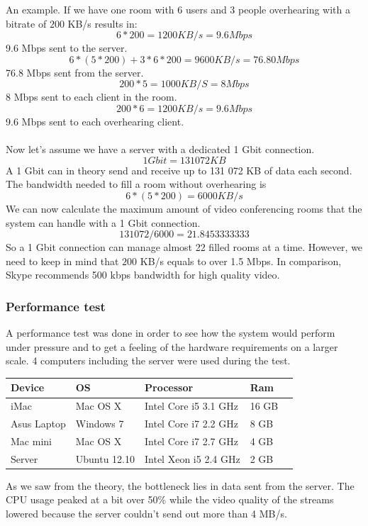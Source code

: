 \documentclass[12pt, titlepage]{article}
\begin{document}
An example. If we have one room with 6 users and 3 people overhearing with a bitrate of $200$ KB/s results in:
\begin{equation}
6*200 = 1200 KB/s = 9.6 Mbps
\end{equation}
9.6 Mbps sent to the server.
\begin{equation}
6*(5*200) + 3*6*200 = 9 600 KB/s = 76.80 Mbps
\end{equation}
76.8 Mbps sent from the server.
\begin{equation}
200*5 = 1000 KB/S  = 8 Mbps
\end{equation}
8 Mbps sent to each client in the room.
\begin{equation}
200*6 = 1200 KB/s = 9.6 Mbps
\end{equation}
9.6 Mbps sent to each overhearing client.
\\\\
Now let's assume we have a server with a dedicated 1 Gbit connection. 
\begin{equation}
1 Gbit = 131 072 KB
\end{equation}
A 1 Gbit can in theory send and receive up to 131 072 KB of data each second. The bandwidth needed to fill a room without overhearing is 
\begin{equation}
6*(5*200) = 6 000 KB/s
\end{equation}
We can now calculate the maximum amount of video conferencing rooms that the system can handle with a 1 Gbit connection.
\begin{equation}
131 072/6 000 = 21.8453333333
\end{equation}
So a 1 Gbit connection can manage almost 22 filled rooms at a time. However, we need to keep in mind that $200$ KB/s equals to over 1.5 Mbps. In comparison, Skype recommends 500 kbps bandwidth for high quality video\cite{39}.
\subsubsection{Performance test}

A performance test was done in order to see how the system would perform under pressure and to get a feeling of the hardware requirements on a larger scale. 4 computers including the server were used during the test.
\begin{center}
    \begin{tabular}{| l | l | l | l | l |}
    \hline
    Device & OS & Processor & Ram \\ \hline
    iMac & Mac OS X & Intel Core i5 3.1 GHz & 16 GB\\ \hline
    Asus Laptop & Windows 7 & Intel Core i7 2.2 GHz & 8 GB \\ \hline
    Mac mini & Mac OS X & Intel Core i7 2.7 GHz & 4 GB \\ \hline
    Server & Ubuntu 12.10 & Intel Xeon i5 2.4 GHz & 2 GB\\ \hline
    \end{tabular}
\end{center}
As we saw from the theory, the bottleneck lies in data sent from the server. The CPU usage peaked at a bit over 50\% while the video quality of the streams lowered because the server couldn't send out more than 4 MB/s.
\end{document}
